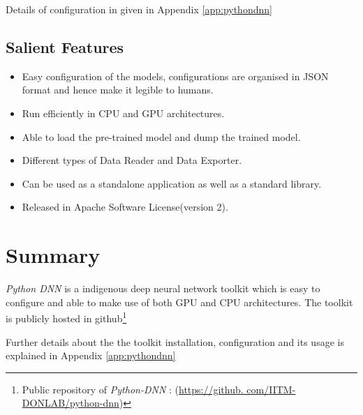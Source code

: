 Details of configuration in given in Appendix \ref{app:pythondnn}

\subsection{Salient Features}
\label{sec:python-dnnFeatures}
\begin{itemize}
\item Easy configuration of the models, configurations
are organised in JSON format and  hence make it legible to humans.
\item Run efficiently in CPU and GPU architectures.
\item Able to load the pre-trained model and dump the trained model.
\item Different types of Data Reader and Data Exporter.
\item Can be used as a standalone application as well as a standard  library.
\item Released in Apache Software License(version 2).\\
\end{itemize}

\section{Summary}
\textit{Python DNN} is a indigenous deep neural network toolkit which is easy to configure and able to make use of both GPU and CPU architectures. The toolkit is publicly hosted in github\footnote{Public repository of \textit{Python-DNN} : (\url{https://github. com/IITM-DONLAB/python-dnn})}

Further details about the the toolkit installation, configuration and its usage is explained in Appendix \ref{app:pythondnn}
